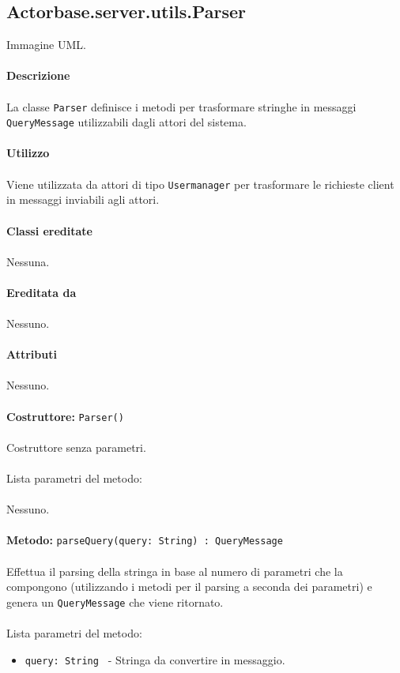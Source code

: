 \documentclass[a4paper]{article}
\begin{document}
	\subsection{Actorbase.server.utils.Parser}
		Immagine UML.
		\\ \\
		\textbf{Descrizione}
			\\ \\
			La classe \texttt{Parser} definisce i metodi per trasformare stringhe in messaggi \texttt{QueryMessage} utilizzabili dagli attori del sistema.
			\\ \\
		\textbf{Utilizzo}
			\\ \\
			Viene utilizzata da attori di tipo \texttt{Usermanager} per trasformare le richieste client in messaggi inviabili agli attori.
			\\ \\
		\textbf{Classi ereditate}
			\\ \\
			Nessuna.
			\\ \\
		\textbf{Ereditata da}
			\\ \\
			Nessuno.
			\\ \\
		\textbf{Attributi}
			\\ \\ 
			Nessuno.
			\\ \\
			\textbf{Costruttore: }\texttt{Parser()}
			\\ \\
			Costruttore senza parametri.
			\\ \\
			Lista parametri del metodo:
			\\ \\
			Nessuno.
			\\ \\
			\textbf{Metodo: }\texttt{parseQuery(query: String) : QueryMessage}
			\\ \\
			Effettua il parsing della stringa in base al numero di parametri che la compongono (utilizzando i metodi per il parsing a seconda dei parametri) e genera un \texttt{QueryMessage} che viene ritornato.
			\\ \\
			Lista parametri del metodo:
			\begin{itemize}
				\item \texttt{query: String } - Stringa da convertire in messaggio.
			\end{itemize}
\end{document}
